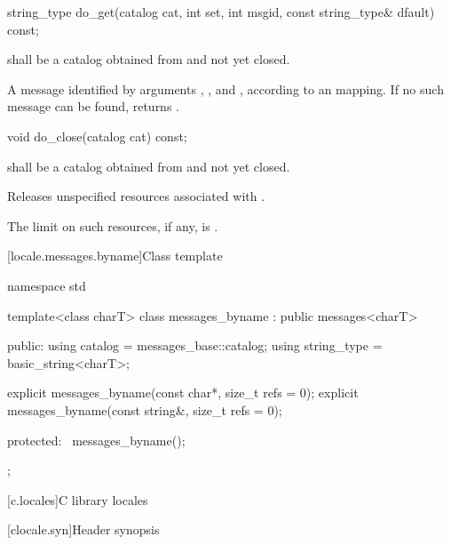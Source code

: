 %
\begin{itemdecl}
string_type do_get(catalog cat, int set, int msgid, const string_type& dfault) const;
\end{itemdecl}

\begin{itemdescr}
\pnum
\requires
{} shall be a catalog obtained from
and not yet closed.

\pnum
\returns
A message identified by arguments , , and , according
to an  mapping. If no
such message can be found, returns .
\end{itemdescr}

%
\begin{itemdecl}
void do_close(catalog cat) const;
\end{itemdecl}

\begin{itemdescr}
\pnum
\requires
{} shall be a catalog obtained from
and not yet closed.

\pnum
\effects
Releases unspecified resources associated with  .

\pnum
\remarks
The limit on such resources, if any, is .
\end{itemdescr}

[locale.messages.byname]{Class template }

%
\begin{codeblock}
namespace std {
  template<class charT>
    class messages_byname : public messages<charT> {
    public:
      using catalog     = messages_base::catalog;
      using string_type = basic_string<charT>;

      explicit messages_byname(const char*, size_t refs = 0);
      explicit messages_byname(const string&, size_t refs = 0);

    protected:
      ~messages_byname();
    };
}
\end{codeblock}

[c.locales]{C library locales}

[clocale.syn]{Header  synopsis}

